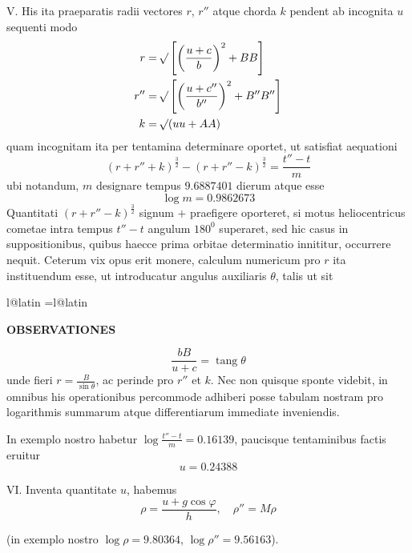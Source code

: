 V. His ita praeparatis radii vectores $r$, $r''$ atque chorda $k$ pendent ab incognita $u$ sequenti modo
\[
\begin{aligned}
r&=\mathord{{}^{}\!\surd}\left[\left(\frac{u+c}{b}\right)^2+BB\right]\\
r''&=\mathord{{}^{}\!\surd}\left[\left(\frac{u+c''}{b''}\right)^2+B''B''\right]\\
k&=\mathord{{}^{}\!\surd}(uu+AA)
\end{aligned}
\]
quam incognitam ita per tentamina determinare oportet, ut satisfiat aequationi
\[
(r+r''+k)^{\frac32}-(r+r''-k)^{\frac32}=\frac{t''-t}{m}
\]
ubi notandum, $m$ designare tempus $9.6887401$ dierum atque esse
\[
\log m=0.9862673
\]
Quantitati $(r+r''-k)^{\frac32}$ signum $+$ praefigere oporteret, si motus heliocentricus cometae intra tempus $t''-t$ angulum $180^0$ superaret, sed hic casus in suppositionibus, quibus haecce prima orbitae determinatio innititur, occurrere nequit. Ceterum vix opus erit monere, calculum numericum pro $r$ ita instituendum esse, ut introducatur angulus auxiliaris $\theta$, talis ut sit
\par{}
\par\clearpage
\endgroup
\clearpage
\begingroup
\pagestyle{empty}
\ifcsname l@latin\endcsname
  \language=\csname l@latin\endcsname\relax
   
\fi
\setlength{\abovedisplayskip}{7pt}
\setlength{\belowdisplayskip}{7pt}
\setlength{\abovedisplayshortskip}{5pt}
\setlength{\belowdisplayshortskip}{5pt}
\setlength{\jot}{2pt}
\thispagestyle{empty}
\noindent{}%
%
\parbox[t]{\dimexpr\linewidth-24mm\relax}{\centering\footnotesize\bfseries OBSERVATIONES\par}%
\makebox[12mm][r]{}\par\nobreak\medskip
\[
\frac{bB}{u+c}=\operatorname{tang}\theta
\]
unde fieri $r=\frac{B}{\sin\theta}$, ac perinde pro $r''$ et $k$. Nec non quisque sponte videbit, in omnibus his operationibus percommode adhiberi posse tabulam nostram pro logarithmis summarum atque differentiarum immediate inveniendis.

In exemplo nostro habetur $\log\frac{t''-t}{m}=0.16139$, paucisque tentaminibus factis eruitur
\[
u=0.24388
\]

VI. Inventa quantitate $u$, habemus
\[
\rho=\frac{u+g\cos\varphi}{h},\quad\rho''=M\rho
\]
\begin{center}(in exemplo nostro $\log\rho=9.80364$, $\log\rho''=9.56163$).\end{center}

